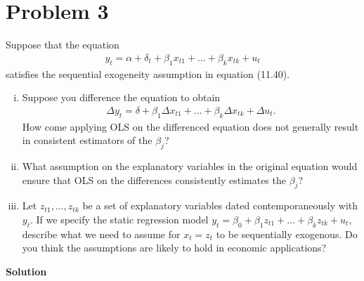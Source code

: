 \documentclass[a4paper]{article}
\begin{document}
\section*{Problem 3}
Suppose that the equation 
\begin{align*}
y_t = \alpha + \delta _t + \beta_1 x_{t1}+\dots+\beta_k x_{tk}+u_t
\end{align*} satisfies the sequential exogeneity assumption in equation (11.40). 
\begin{enumerate}[(i)]
\item Suppose you difference the equation to obtain 
\begin{align}\label{eq1}
\Delta y_t = \delta +\beta_1 \Delta x_{t1} + \dots+ \beta_k \Delta x_{tk} + \Delta u_t.
\end{align}
How come applying OLS on the differenced equation does not generally result in consistent estimators of the $\beta_j$?
\item What assumption on the explanatory variables in the original equation would ensure that OLS on the differences consistently estimates the $\beta_j$?
\item Let $z_{t1},\dots, z_{tk}$ be a set of explanatory variables dated contemporaneously with $y_t$. If we specify the static regression model $y_t = \beta_0 + \beta_1z_{t1} +\dots+ \beta_k z_{tk} + u_t$, describe what we need to assume for $x_t = z_t$ to be sequentially exogenous. Do you think the assumptions are likely to hold in economic applications?
\end{enumerate}

\textbf{Solution}
\end{document}
